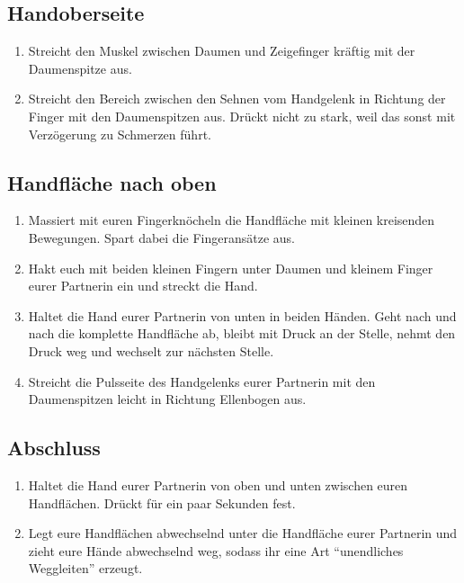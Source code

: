 \subsection{Handoberseite}
\begin{enumerate}
  \item {} Streicht den Muskel zwischen Daumen und Zeigefinger kräftig mit der Daumenspitze aus.
  \item {} Streicht den Bereich zwischen den Sehnen vom Handgelenk in Richtung der Finger  mit den Daumenspitzen aus. Drückt nicht zu stark, weil das sonst mit Verzögerung zu Schmerzen führt.
\end{enumerate}

\pagebreak
\subsection{Handfläche nach oben}
\begin{enumerate}
  \item {} Massiert mit euren Fingerknöcheln die Handfläche mit kleinen kreisenden Bewegungen. Spart dabei die Fingeransätze aus.
  \item {} Hakt euch mit beiden kleinen Fingern unter Daumen und kleinem Finger eurer Partnerin ein und streckt die Hand.
  \item {} Haltet die Hand eurer Partnerin von unten in beiden Händen. Geht nach und nach die komplette Handfläche ab, bleibt mit Druck an der Stelle, nehmt den Druck weg und wechselt zur nächsten Stelle.
  \item {} Streicht die Pulsseite des Handgelenks eurer Partnerin mit den Daumenspitzen leicht in Richtung Ellenbogen aus.
\end{enumerate}

\subsection{Abschluss}
\begin{enumerate}
  \item {} Haltet die Hand eurer Partnerin von oben und unten zwischen euren Handflächen. Drückt für ein paar Sekunden fest.
  \item {} Legt eure Handflächen abwechselnd unter die Handfläche eurer Partnerin und zieht eure Hände abwechselnd weg, sodass ihr eine Art "`unendliches Weggleiten"' erzeugt.
\end{enumerate}
